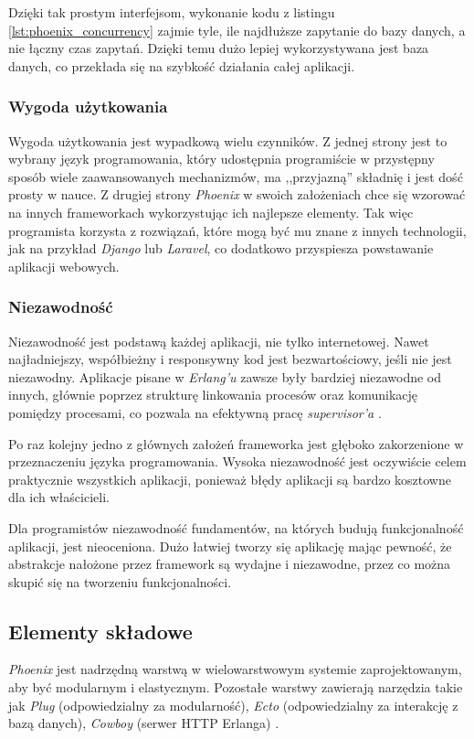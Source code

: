 \documentclass[mgr,oneside]{mgr}
\begin{document}
Dzięki tak prostym interfejsom, wykonanie kodu z listingu \ref{lst:phoenix_concurrency} zajmie tyle, ile najdłuższe zapytanie do bazy danych, a nie łączny czas zapytań. Dzięki temu dużo lepiej wykorzystywana jest baza danych, co przekłada się na szybkość działania całej aplikacji.

\subsubsection{Wygoda użytkowania}
Wygoda użytkowania jest wypadkową wielu czynników. Z jednej strony jest to wybrany język programowania, który udostępnia programiście w przystępny sposób wiele zaawansowanych mechanizmów, ma ,,przyjazną'' składnię i jest dość prosty w nauce. Z drugiej strony \textit{Phoenix} w swoich założeniach chce się wzorować na innych frameworkach wykorzystując ich najlepsze elementy. Tak więc programista korzysta z rozwiązań, które mogą być mu znane z innych technologii, jak na przykład \textit{Django} lub \textit{Laravel}, co dodatkowo przyspiesza powstawanie aplikacji webowych.

\subsubsection{Niezawodność}
Niezawodność jest podstawą każdej aplikacji, nie tylko internetowej. Nawet najładniejszy, współbieżny i responsywny kod jest bezwartościowy, jeśli nie jest niezawodny. Aplikacje pisane w \textit{Erlang'u} zawsze były bardziej niezawodne od innych, głównie poprzez strukturę linkowania procesów oraz komunikację pomiędzy procesami, co pozwala na efektywną pracę \textit{supervisor'a} \cite{phoenix_doctrine}.

Po raz kolejny jedno z głównych założeń frameworka jest głęboko zakorzenione w przeznaczeniu języka programowania. Wysoka niezawodność jest oczywiście celem praktycznie wszystkich aplikacji, ponieważ błędy aplikacji są bardzo kosztowne dla ich właścicieli.

Dla programistów niezawodność fundamentów, na których budują funkcjonalność aplikacji, jest nieoceniona. Dużo łatwiej tworzy się aplikację mając pewność, że abstrakcje nałożone przez framework są wydajne i niezawodne, przez co można skupić się na tworzeniu funkcjonalności.

\subsection{Elementy składowe}
\textit{Phoenix} jest nadrzędną warstwą w wielowarstwowym systemie zaprojektowanym, aby być modularnym i elastycznym. Pozostałe warstwy zawierają narzędzia takie jak \textit{Plug} (odpowiedzialny za modularność), \textit{Ecto} (odpowiedzialny za interakcję z bazą danych), \textit{Cowboy} (serwer HTTP Erlanga) \cite{phoenix_docs}.
\end{document}
